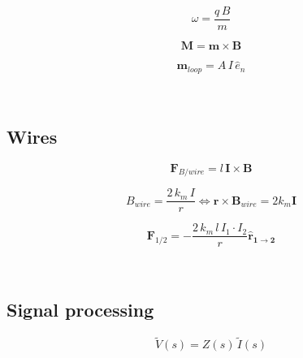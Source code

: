 \documentclass{form}
\begin{document}
\begin{minipage}[c]{0.08\textwidth}
	\begin{equation*}
		\omega=\dfrac{q\,B}{m}
	\end{equation*}
\end{minipage}
\begin{minipage}[c]{0.12\textwidth}
	\begin{equation*}
		\mathbf{M}=\mathbf{m}\times \mathbf{B}
	\end{equation*}
\end{minipage}
\begin{minipage}[c]{0.12\textwidth}
	\begin{equation*}
		\mathbf{m}_{loop}=A\,I\,\widehat{e}_n
	\end{equation*}
\end{minipage} \\
\begin{minipage}[c]{0.15\textwidth}
	\subsection*{Wires}
\end{minipage}
\begin{minipage}[c]{0.20\textwidth}
	\begin{equation*}
		\mathbf{F}_{B/wire}=l\,\mathbf{I}\times\mathbf{B}
	\end{equation*}
\end{minipage}
\begin{minipage}[c]{0.35\textwidth}
	\begin{equation*}
		B_{wire}=\frac{2\,k_m\,I}{r} \iff \mathbf{r}\times\mathbf{B}_{wire}=2 k_m \mathbf{I}
	\end{equation*}
\end{minipage}
\begin{minipage}[c]{0.25\textwidth}
	\begin{equation*}
		\mathbf{F}_{1/2}=-\frac{2\,k_m\,l\,I_1 \cdot I_2}{r}\mathbf{\hat{r}_{1\rightarrow 2}}
	\end{equation*}
\end{minipage}\\
\begin{minipage}[c]{0.19\textwidth}
	\subsection*{Signal processing}
\end{minipage}%
\begin{minipage}[c]{0.16\textwidth}
	\begin{equation*}
		\tilde{V}(s)=Z(s)\,\tilde{I}(s)
	\end{equation*}
\end{minipage}%
\end{document}
